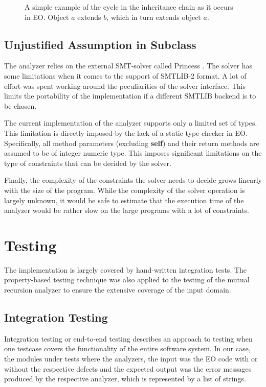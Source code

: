 \begin{figure}
  \begin{center}
    \begin{tabular}{c}  
  
    \end{tabular}
  \end{center}
  \caption{A simple example of the cycle in the inheritance chain as it occurs in EO. Object $a$ extends $b$, which in turn extends object $a$.}
  \label{fig:inheritance_chain}
\end{figure}

\subsection{Unjustified Assumption in Subclass}
The analyzer relies on the external SMT-solver called Princess \cite{princess}. The solver has some limitations when it comes to the support of SMTLIB-2 \cite{smtlib} format. A lot of effort was spent working around the peculiarities of the solver interface. This limits the portability of the implementation if a different SMTLIB backend is to be chosen.

The current implementation of the analyzer supports only a limited set of types. This limitation is directly imposed by the lack of a static type checker in EO. Specifically, all method parameters (excluding \textbf{self}) and their return methods are assumed to be of integer numeric type. This imposes significant limitations on the type of constraints that can be decided by the solver.

Finally, the complexity of the constraints the solver needs to decide grows linearly with the size of the program. While the complexity of the solver operation is largely unknown, it would be safe to estimate that the execution time of the analyzer would be rather slow on the large programs with a lot of constraints.

\section{Testing}
\label{eval:testing}
The implementation is largely covered by hand-written integration tests. The property-based testing technique \cite{property_based_testing} was also applied to the testing of the mutual recursion analyzer to ensure the extensive coverage of the input domain.

\subsection{Integration Testing}
\label{eval:integration_testing}
Integration testing or end-to-end testing \cite[Chapter 7]{testing} describes an approach to testing when one testcase covers the functionality of the entire software system. In our case, the modules under tests where the analyzers, the input was the EO code with or without the respective defects and the expected output was the error messages produced by the respective analyzer, which is represented by a list of strings.

